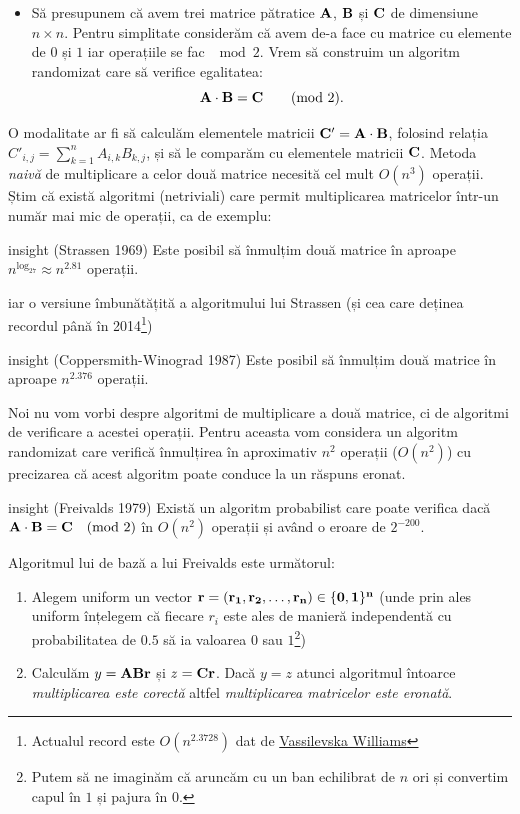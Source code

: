 \documentclass[]{article}
\let\rmarkdownfootnote\footnote%
\def\footnote{\protect\rmarkdownfootnote}
\newenvironment{frshaded*}{%
  \def\FrameCommand{\fboxrule=\FrameRule\fboxsep=\FrameSep \fcolorbox{framecolor}{shadecolor1}}%
  \MakeFramed {\advance\hsize-\width \FrameRestore}}%
{\endMakeFramed}
\newenvironment{rmdblock}[1]
  {\begin{frshaded*}
  \begin{itemize}
  \renewcommand{\labelitemi}{
    \raisebox{-.7\height}[0pt][0pt]{
      {\setkeys{Gin}{width=2em,keepaspectratio}\texttt{[image: images/icons/\#1]}}
    }
  }
  \item
  }
  {
  \end{itemize}
  \end{frshaded*}
  }
\newenvironment{rmdexercise}
  {\begin{rmdblock}{exercise}}
  {\end{rmdblock}}
\newenvironment{frshaded_insight*}{%
  \def\FrameCommand{\fboxrule=\FrameRule\fboxsep=\FrameSep \fcolorbox{framecolor_insight}{shadecolor_insight}}%
  \MakeFramed {\advance\hsize-\width \FrameRestore}}%
{\endMakeFramed}
\newenvironment{rmdblock_insight}[1]
  {\begin{frshaded_insight*}
  \begin{itemize}
  \renewcommand{\labelitemi}{
    \raisebox{-.7\height}[0pt][0pt]{
      {\setkeys{Gin}{width=2em,keepaspectratio}\texttt{[image: images/icons/\#1]}}
    }
  }
  \item
  }
  {
  \end{itemize}
  \end{frshaded_insight*}
  }
\newenvironment{rmdinsight}
  {\begin{rmdblock_insight}{insight}}
  {\end{rmdblock_insight}}
\begin{document}
\begin{rmdexercise}
Să presupunem că avem trei matrice pătratice \(\bf{A}\), \(\bf{B}\) și
\(\bf{C}\) de dimensiune \(n \times n\). Pentru simplitate considerăm că
avem de-a face cu matrice cu elemente de \(0\) și \(1\) iar operațiile
se fac \(\mod2\). Vrem să construim un algoritm randomizat care să
verifice egalitatea: \[
  \bf{A}\cdot\bf{B}=\bf{C} \qquad (\text{mod 2}).
\]
\end{rmdexercise}

O modalitate ar fi să calculăm elementele matricii
\(\bf{C}'=\bf{A}\cdot\bf{B}\), folosind relația
\(C'_{i,j} = \sum_{k=1}^{n}A_{i,k}B_{k,j}\), și să le comparăm cu
elementele matricii \(\bf{C}\). Metoda \emph{naivă} de multiplicare a
celor două matrice necesită cel mult \(O(n^3)\) operații. Știm că există
algoritmi (netriviali) care permit multiplicarea matricelor într-un
număr mai mic de operații, ca de exemplu:

\begin{rmdinsight}
(Strassen 1969) Este posibil să înmulțim două matrice în aproape
\(n^{\log_27}\approx n^{2.81}\) operații.
\end{rmdinsight}

iar o versiune îmbunătățită a algoritmului lui Strassen (și cea care
deținea recordul până în 2014\footnote{Actualul record este
  \(O(n^{2.3728})\) dat de
  \href{http://theory.stanford.edu/~virgi/matrixmult-f.pdf}{Vassilevska
  Williams}})

\begin{rmdinsight}
(Coppersmith-Winograd 1987) Este posibil să înmulțim două matrice în
aproape \(n^{2.376}\) operații.
\end{rmdinsight}

Noi nu vom vorbi despre algoritmi de multiplicare a două matrice, ci de
algoritmi de verificare a acestei operații. Pentru aceasta vom considera
un algoritm randomizat care verifică înmulțirea în aproximativ \(n^2\)
operații (\(O(n^2)\)) cu precizarea că acest algoritm poate conduce la
un răspuns eronat.

\begin{rmdinsight}
(Freivalds 1979) Există un algoritm probabilist care poate verifica dacă
\(\bf{A}\cdot\bf{B}=\bf{C} \quad (\text{mod 2})\) în \(O(n^2)\) operații
și având o eroare de \(2^{-200}\).
\end{rmdinsight}

Algoritmul lui de bază a lui Freivalds este următorul:

\begin{enumerate}
\def\labelenumi{\arabic{enumi}.}
\item
  Alegem uniform un vector \(\bf{r}=(r_1,r_2,\ldots,r_n)\in\{0,1\}^n\)
  (unde prin ales uniform înțelegem că fiecare \(r_i\) este ales de
  manieră independentă cu probabilitatea de \(0.5\) să ia valoarea \(0\)
  sau \(1\)\footnote{Putem să ne imaginăm că aruncăm cu un ban
    echilibrat de \(n\) ori și convertim capul în \(1\) și pajura în
    \(0\).})
\item
  Calculăm \(y = \bf{A}\bf{B}\bf{r}\) și \(z = \bf{C}\bf{r}\). Dacă
  \(y = z\) atunci algoritmul întoarce \emph{multiplicarea este corectă}
  altfel \emph{multiplicarea matricelor este eronată}.
\end{enumerate}
\end{document}
